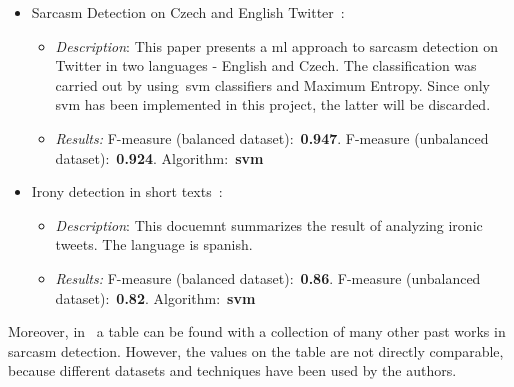 \begin{itemize}
	\item Sarcasm Detection on Czech and English Twitter~\cite{ptavcek2014sarcasm}:
	\begin{itemize}
		\item \textit{Description}: This paper presents a \ac{ml} approach to sarcasm detection on Twitter in two languages - English and Czech. The classification was carried out by using~\ac{svm} classifiers and Maximum Entropy. Since only \ac{svm} has been implemented in this project, the latter will be discarded.
		\item \textit{Results:} F-measure (balanced dataset):~\textbf{0.947}. F-measure (unbalanced dataset):~\textbf{0.924}. Algorithm:~\textbf{\ac{svm}}
	\end{itemize}
	\item Irony detection in short texts~\cite{mexic}:
	\begin{itemize}
		\item \textit{Description}: This docuemnt summarizes the result of analyzing ironic tweets. The language is spanish.
		\item \textit{Results:} F-measure (balanced dataset):~\textbf{0.86}. F-measure (unbalanced dataset):~\textbf{0.82}. Algorithm:~\textbf{\ac{svm}}
	\end{itemize}
	
\end{itemize}
Moreover, in~\cite{joshi2017automatic} a table can be found with a collection of many other past works in sarcasm detection. However, the values on the table are not directly comparable, because different datasets and techniques have been used by the authors.\\
